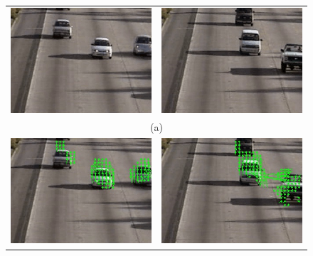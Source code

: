 \documentclass[journal]{IEEEtran}
\begin{document}
\FloatBarrier
\begin{figure}[h]
  \centering  
    \begin{tabular}{cc}
	\includegraphics[scale = 0.3]{./images/frame1.jpg}& 
	\includegraphics[scale = 0.3]{./images/frame2.jpg} \\
		     \multicolumn{2}{c}{\scriptsize(a) }  \\
	\includegraphics[scale = 0.3]{./images/flux1.jpg} &
	\includegraphics[scale = 0.3]{./images/flux2.jpg}\\

\end{tabular}
\end{figure}
\end{document}
